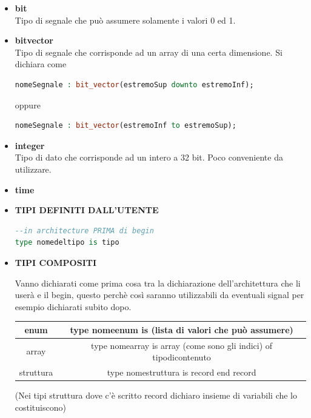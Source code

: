 \documentclass[a4paper]{book}
\begin{document}
\begin{itemize}

\item\textbf{bit}\\
Tipo di segnale che può assumere solamente i valori 0 ed 1.
\item\textbf{bit\textunderscore vector}\\
Tipo di segnale che corrisponde ad un array di una certa dimensione.
Si dichiara come 
\begin{lstlisting}[language=VHDL]
nomeSegnale : bit_vector(estremoSup downto estremoInf);
\end{lstlisting}
oppure
\begin{lstlisting}[language=VHDL]
nomeSegnale : bit_vector(estremoInf to estremoSup);
\end{lstlisting}
\item\textbf{integer}\\
Tipo di dato che corrisponde ad un intero a 32 bit. Poco conveniente da utilizzare.
\item\textbf{time}\\

\item\textbf{TIPI DEFINITI DALL'UTENTE}

\begin{lstlisting}[language=VHDL]
--in architecture PRIMA di begin
type nomedeltipo is tipo
\end{lstlisting}

\item\textbf{TIPI COMPOSITI}

Vanno dichiarati come prima cosa tra la dichiarazione dell'architettura che li userà e il begin, questo perchè così saranno utilizzabili da eventuali signal per esempio dichiarati subito dopo.

\begin{tabular}{|c|c|}
\hline
enum & type nomeenum is (lista di valori che può assumere)\\
\hline
array & type nomearray is array (come sono gli indici) of tipodicontenuto \\
\hline
struttura & type nomestruttura is record end record \\
\hline

\end{tabular}

(Nei tipi struttura dove c'è scritto record dichiaro insieme di variabili che lo costituiscono)

\end{itemize}
\end{document}
